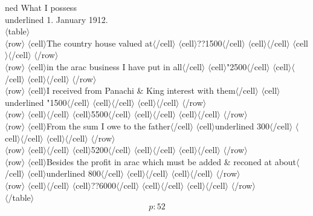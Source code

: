 \documentclass{report}
\begin{document}
	\par{
 	ned What I possess\rbrack\ \\\lbrack underlined 1. January 1912.\rbrack\ \\$\langle$table$\rangle$\ \\$\langle$row$\rangle$ $\langle$cell$\rangle$The country house valued at$\langle$/cell$\rangle$ $\langle$cell$\rangle$??1500$\langle$/cell$\rangle$ $\langle$cell$\rangle$$\langle$/cell$\rangle$ $\langle$cell$\rangle$$\langle$/cell$\rangle$ $\langle$/row$\rangle$\ \\$\langle$row$\rangle$ $\langle$cell$\rangle$in the arac business I have put in all$\langle$/cell$\rangle$ $\langle$cell$\rangle$"2500$\langle$/cell$\rangle$ $\langle$cell$\rangle$$\langle$/cell$\rangle$ $\langle$cell$\rangle$$\langle$/cell$\rangle$ $\langle$/row$\rangle$\ \\$\langle$row$\rangle$ $\langle$cell$\rangle$I received from Panachi \& King interest with them$\langle$/cell$\rangle$ $\langle$cell$\rangle$\lbrack underlined "1500\rbrack $\langle$/cell$\rangle$ $\langle$cell$\rangle$$\langle$/cell$\rangle$ $\langle$cell$\rangle$$\langle$/cell$\rangle$ $\langle$/row$\rangle$\ \\$\langle$row$\rangle$ $\langle$cell$\rangle$$\langle$/cell$\rangle$ $\langle$cell$\rangle$5500$\langle$/cell$\rangle$ $\langle$cell$\rangle$$\langle$/cell$\rangle$ $\langle$cell$\rangle$$\langle$/cell$\rangle$ $\langle$/row$\rangle$\ \\$\langle$row$\rangle$ $\langle$cell$\rangle$From the sum I owe to the father$\langle$/cell$\rangle$ $\langle$cell$\rangle$\lbrack underlined 300\rbrack $\langle$/cell$\rangle$ $\langle$cell$\rangle$$\langle$/cell$\rangle$ $\langle$cell$\rangle$$\langle$/cell$\rangle$ $\langle$/row$\rangle$\ \\$\langle$row$\rangle$ $\langle$cell$\rangle$$\langle$/cell$\rangle$ $\langle$cell$\rangle$5200$\langle$/cell$\rangle$ $\langle$cell$\rangle$$\langle$/cell$\rangle$ $\langle$cell$\rangle$$\langle$/cell$\rangle$ $\langle$/row$\rangle$\ \\$\langle$row$\rangle$ $\langle$cell$\rangle$Besides the profit in arac which must be added \& reconed at about$\langle$/cell$\rangle$ $\langle$cell$\rangle$\lbrack underlined 800\rbrack $\langle$/cell$\rangle$ $\langle$cell$\rangle$$\langle$/cell$\rangle$ $\langle$cell$\rangle$$\langle$/cell$\rangle$ $\langle$/row$\rangle$\ \\$\langle$row$\rangle$ $\langle$cell$\rangle$$\langle$/cell$\rangle$ $\langle$cell$\rangle$??6000$\langle$/cell$\rangle$ $\langle$cell$\rangle$$\langle$/cell$\rangle$ $\langle$cell$\rangle$$\langle$/cell$\rangle$ $\langle$/row$\rangle$\ \\$\langle$/table$\rangle$\ \\
  \[p: 52 \]

	}

 
 
\end{document}
